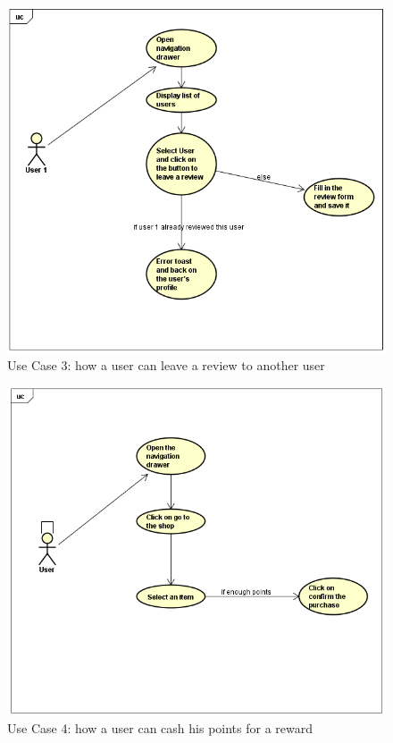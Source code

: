 \documentclass[paper=a4, fontsize=12pt,DIV=14]{scrartcl}    %
\begin{document}
		                \begin{figure}[!htbp]
		                    \center
		                    \includegraphics[scale=0.7]{img/leave_review.png}
		                    \caption{Use Case 3: how a user can leave a review to another user}
		                \end{figure}

		                \begin{figure}[!htbp]
		                    \center
		                    \includegraphics[scale=0.75]{img/shop.png}
		                    \caption{Use Case 4: how a user can cash his points for a reward}
		                \end{figure}
\newpage
\end{document}
